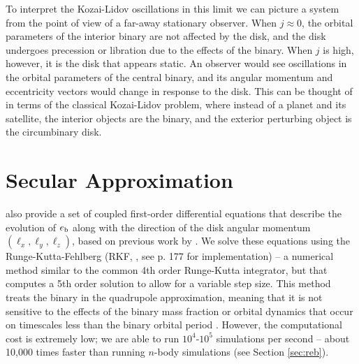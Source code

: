 \documentclass[twocolumn]{aastex631}
\begin{document}
To interpret the Kozai-Lidov oscillations in this limit we can picture a system from the point of view of a far-away stationary observer. When $j \approx 0$, the orbital parameters of the interior binary are not affected by the disk, and the disk undergoes precession or libration due to the effects of the binary. When $j$ is high, however, it is the disk that appears static. An observer would see oscillations in the orbital parameters of the central binary, and its angular momentum and eccentricity vectors would change in response to the disk. This can be thought of in terms of the classical Kozai-Lidov problem, where instead of a planet and its satellite, the interior objects are the binary, and the exterior perturbing object is the circumbinary disk.

\section{Secular Approximation}
\label{sec:rk}
\citet[Equations (7-10)]{martin2019} also provide a set of coupled first-order differential equations that describe the evolution of $e_{\rm b}$ along with the direction of the disk angular momentum $(\ell_x, \ell_y, \ell_z)$, based on previous work by \citet{farago2010}. We solve these equations using the Runge-Kutta-Fehlberg (RKF, \citealt{fehlberg1969}, see \citealt{hairer2000} p. 177 for implementation) -- a numerical method similar to the common 4th order Runge-Kutta integrator, but that computes a 5th order solution to allow for a variable step size. This method treats the binary in the quadrupole approximation, meaning that it is not sensitive to the effects of the binary mass fraction or orbital dynamics that occur on timescales less than the binary orbital period \citep[e.g.][]{naoz2016}. However, the computational cost is extremely low; we are able to run $10^4$-$10^5$ simulations per second -- about 10,000 times faster than running $n$-body simulations (see Section \ref{sec:reb}).
\end{document}
